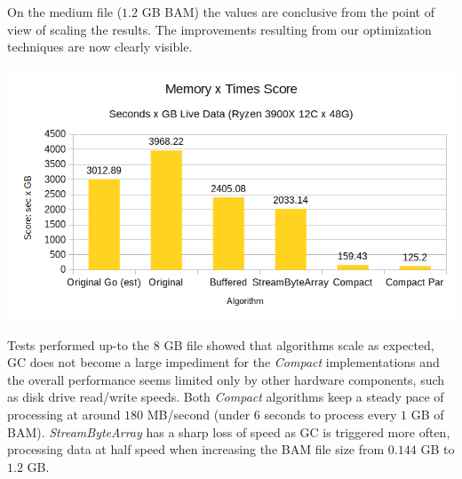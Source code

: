 \documentclass[a4paper,twoside]{article}
\begin{document}

On the medium file ($1.2$ GB BAM) the values are conclusive from the point of view of scaling the results. The improvements resulting from our optimization techniques are now clearly visible.
\begin{center}
	\includegraphics[scale=0.5]{images/times_and_memory_chart.png}
\end{center}



%


Tests performed up-to the $8$ GB file showed that algorithms scale as expected, GC does not become a large impediment for the \textit{Compact} implementations and the overall performance seems limited only by other hardware components, such as disk drive read/write speeds.
Both \textit{Compact} algorithms keep a steady pace of processing at around $180$ MB/second (under $6$ seconds to process every $1$ GB of BAM). \textit{StreamByteArray} has a sharp loss of speed as GC is triggered more often, processing data at half speed when increasing the BAM file size from $0.144$ GB to $1.2$ GB.
\end{document}
